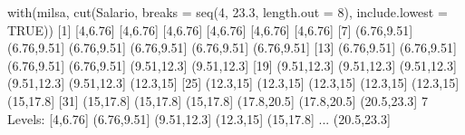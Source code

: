 \documentclass[
  10pt,
  a4paper]{book}
\newenvironment{Shaded}{\begin{snugshade}}{\end{snugshade}}
\newcommand{\AttributeTok}[1]{\textcolor[rgb]{0.77,0.63,0.00}{#1}}
\newcommand{\ConstantTok}[1]{\textcolor[rgb]{0.00,0.00,0.00}{#1}}
\newcommand{\DecValTok}[1]{\textcolor[rgb]{0.00,0.00,0.81}{#1}}
\newcommand{\FloatTok}[1]{\textcolor[rgb]{0.00,0.00,0.81}{#1}}
\newcommand{\FunctionTok}[1]{\textcolor[rgb]{0.00,0.00,0.00}{#1}}
\newcommand{\NormalTok}[1]{#1}
\newcommand{\SpecialCharTok}[1]{\textcolor[rgb]{0.00,0.00,0.00}{#1}}
\begin{document}
\begin{Shaded}
\begin{Highlighting}[]
\FunctionTok{with}\NormalTok{(milsa, }\FunctionTok{cut}\NormalTok{(Salario, }\AttributeTok{breaks =} \FunctionTok{seq}\NormalTok{(}\DecValTok{4}\NormalTok{, }\FloatTok{23.3}\NormalTok{, }\AttributeTok{length.out =} \DecValTok{8}\NormalTok{),}
    \AttributeTok{include.lowest =} \ConstantTok{TRUE}\NormalTok{))}
\NormalTok{ [}\DecValTok{1}\NormalTok{] [}\DecValTok{4}\NormalTok{,}\FloatTok{6.76}\NormalTok{]    [}\DecValTok{4}\NormalTok{,}\FloatTok{6.76}\NormalTok{]    [}\DecValTok{4}\NormalTok{,}\FloatTok{6.76}\NormalTok{]    [}\DecValTok{4}\NormalTok{,}\FloatTok{6.76}\NormalTok{]    [}\DecValTok{4}\NormalTok{,}\FloatTok{6.76}\NormalTok{]    [}\DecValTok{4}\NormalTok{,}\FloatTok{6.76}\NormalTok{]   }
\NormalTok{ [}\DecValTok{7}\NormalTok{] (}\FloatTok{6.76}\NormalTok{,}\FloatTok{9.51}\NormalTok{] (}\FloatTok{6.76}\NormalTok{,}\FloatTok{9.51}\NormalTok{] (}\FloatTok{6.76}\NormalTok{,}\FloatTok{9.51}\NormalTok{] (}\FloatTok{6.76}\NormalTok{,}\FloatTok{9.51}\NormalTok{] (}\FloatTok{6.76}\NormalTok{,}\FloatTok{9.51}\NormalTok{] (}\FloatTok{6.76}\NormalTok{,}\FloatTok{9.51}\NormalTok{]}
\NormalTok{[}\DecValTok{13}\NormalTok{] (}\FloatTok{6.76}\NormalTok{,}\FloatTok{9.51}\NormalTok{] (}\FloatTok{6.76}\NormalTok{,}\FloatTok{9.51}\NormalTok{] (}\FloatTok{6.76}\NormalTok{,}\FloatTok{9.51}\NormalTok{] (}\FloatTok{6.76}\NormalTok{,}\FloatTok{9.51}\NormalTok{] (}\FloatTok{9.51}\NormalTok{,}\FloatTok{12.3}\NormalTok{] (}\FloatTok{9.51}\NormalTok{,}\FloatTok{12.3}\NormalTok{]}
\NormalTok{[}\DecValTok{19}\NormalTok{] (}\FloatTok{9.51}\NormalTok{,}\FloatTok{12.3}\NormalTok{] (}\FloatTok{9.51}\NormalTok{,}\FloatTok{12.3}\NormalTok{] (}\FloatTok{9.51}\NormalTok{,}\FloatTok{12.3}\NormalTok{] (}\FloatTok{9.51}\NormalTok{,}\FloatTok{12.3}\NormalTok{] (}\FloatTok{9.51}\NormalTok{,}\FloatTok{12.3}\NormalTok{] (}\FloatTok{12.3}\NormalTok{,}\DecValTok{15}\NormalTok{]  }
\NormalTok{[}\DecValTok{25}\NormalTok{] (}\FloatTok{12.3}\NormalTok{,}\DecValTok{15}\NormalTok{]   (}\FloatTok{12.3}\NormalTok{,}\DecValTok{15}\NormalTok{]   (}\FloatTok{12.3}\NormalTok{,}\DecValTok{15}\NormalTok{]   (}\FloatTok{12.3}\NormalTok{,}\DecValTok{15}\NormalTok{]   (}\FloatTok{12.3}\NormalTok{,}\DecValTok{15}\NormalTok{]   (}\DecValTok{15}\NormalTok{,}\FloatTok{17.8}\NormalTok{]  }
\NormalTok{[}\DecValTok{31}\NormalTok{] (}\DecValTok{15}\NormalTok{,}\FloatTok{17.8}\NormalTok{]   (}\DecValTok{15}\NormalTok{,}\FloatTok{17.8}\NormalTok{]   (}\DecValTok{15}\NormalTok{,}\FloatTok{17.8}\NormalTok{]   (}\FloatTok{17.8}\NormalTok{,}\FloatTok{20.5}\NormalTok{] (}\FloatTok{17.8}\NormalTok{,}\FloatTok{20.5}\NormalTok{] (}\FloatTok{20.5}\NormalTok{,}\FloatTok{23.3}\NormalTok{]}
\DecValTok{7}\NormalTok{ Levels}\SpecialCharTok{:}\NormalTok{ [}\DecValTok{4}\NormalTok{,}\FloatTok{6.76}\NormalTok{] (}\FloatTok{6.76}\NormalTok{,}\FloatTok{9.51}\NormalTok{] (}\FloatTok{9.51}\NormalTok{,}\FloatTok{12.3}\NormalTok{] (}\FloatTok{12.3}\NormalTok{,}\DecValTok{15}\NormalTok{] (}\DecValTok{15}\NormalTok{,}\FloatTok{17.8}\NormalTok{] }\FunctionTok{...}\NormalTok{ (}\FloatTok{20.5}\NormalTok{,}\FloatTok{23.3}\NormalTok{]}
\end{Highlighting}
\end{Shaded}
\end{document}
